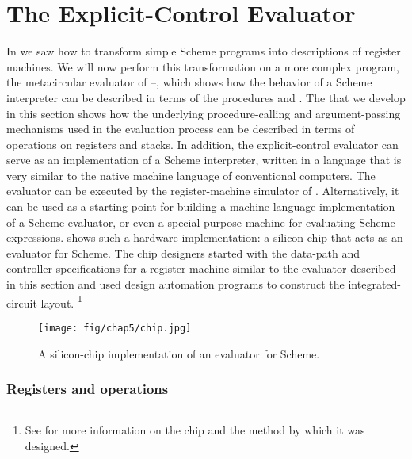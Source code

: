 \section{The Explicit-Control Evaluator}
\label{Section 5.4}

In  we saw how to transform simple Scheme programs into descriptions of register machines.
We will now perform this transformation on a more complex program, the metacircular evaluator of --, which shows how the behavior of a Scheme interpreter can be described in terms of the procedures  and .
The  that we develop in this section shows how the underlying procedure-calling and argument-passing mechanisms used in the evaluation process can be described in terms of operations on registers and stacks.
In addition, the explicit-control evaluator can serve as an implementation of a Scheme interpreter, written in a language that is very similar to the native machine language of conventional computers.
The evaluator can be executed by the register-machine simulator of .
Alternatively, it can be used as a starting point for building a machine-language implementation of a Scheme evaluator, or even a special-purpose machine for evaluating Scheme expressions.
 shows such a hardware implementation:
a silicon chip that acts as an evaluator for Scheme.
The chip designers started with the data-path and controller specifications for a register machine similar to the evaluator described in this section and used design automation programs to construct the integrated-circuit layout.%
\footnote{
	See  for more information on the chip and the method by which it was designed.
}

\begin{figure}[tb]
	\centering
	\texttt{[image: fig/chap5/chip.jpg]}
	\caption{
		A silicon-chip implementation of an evaluator for Scheme.
	}
	\label{Figure 5.16}
\end{figure}



\subsubsection*{Registers and operations}

